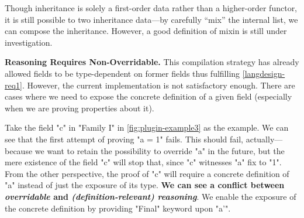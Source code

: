 Though inheritance is solely a first-order data rather
than a higher-order functor, it is still possible to
 two inheritance data---by carefully ``mix'' the internal list, we can compose the inheritance. However, a good definition of mixin is still under investigation.





\textbf{Reasoning Requires Non-Overridable.}
This compilation strategy
has already allowed fields to be type-dependent on former fields thus fulfilling
\ref{langdesign-req1}. However, the current implementation is not satisfactory enough. There are cases where we need to expose
the concrete definition of a given field (especially when we are proving
properties about it).

Take the field "c" in "Family I" in \cref{fig:plugin-example3} as the
example. We can see that the first attempt of proving "a = 1" fails.
This should fail, actually---because we want to retain the possibility
to override "a" in the future, but the mere existence of the field "c"
will stop that, since "c" witnesses "a" fix to "1". From the other
perspective, the proof of "c" will require a concrete definition of "a"
instead of just the exposure of its type. \textbf{We can see a conflict
between \textit{overridable} and \textit{(definition-relevant)
reasoning}}.  We enable the exposure of the concrete definition by
providing "Final" keyword upon "a'".

